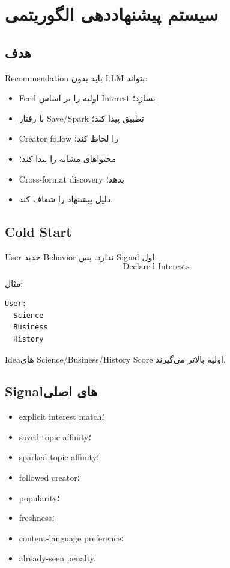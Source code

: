 
\chapter{سیستم پیشنهاددهی الگوریتمی}

\section{هدف}

Recommendation باید بدون LLM بتواند:
\begin{itemize}
  \item Feed اولیه را بر اساس Interest بسازد؛
  \item با رفتار Save/Spark تطبیق پیدا کند؛
  \item Creator follow را لحاظ کند؛
  \item محتواهای مشابه را پیدا کند؛
  \item Cross-format discovery بدهد؛
  \item دلیل پیشنهاد را شفاف کند.
\end{itemize}

\section{Cold Start}

User جدید Behavior ندارد. پس Signal اول:
\[
\text{Declared Interests}
\]

مثال:
\begin{latin}
\begin{lstlisting}
User:
  Science
  Business
  History
\end{lstlisting}
\end{latin}

Ideaهای Science/Business/History Score اولیه بالاتر می‌گیرند.

\section{Signalهای اصلی}

\begin{itemize}
  \item explicit interest match؛
  \item saved-topic affinity؛
  \item sparked-topic affinity؛
  \item followed creator؛
  \item popularity؛
  \item freshness؛
  \item content-language preference؛
  \item already-seen penalty.
\end{itemize}

